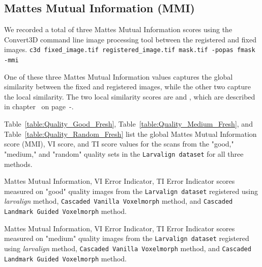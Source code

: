 \documentclass{book}
\begin{document}

	\subsection{Mattes Mutual Information (MMI)}
	We recorded a total of three Mattes Mutual Information \cite{mattes} scores using the Convert3D command line image processing tool between the registered and fixed images. \newline
	\verb|c3d fixed_image.tif registered_image.tif mask.tif -popas fmask -mmi|
	
	One of these three Mattes Mutual Information values captures the global similarity between the fixed and registered images, while the other two capture the local similarity. The two local similarity scores are  and , which are described in chapter~ on page~\pageref{subsubsec:vi}-\pageref{subsubsec:ti}.
	
	Table~\ref{table:Quality_Good_Fresh}, Table~\ref{table:Quality_Medium_Fresh}, and Table~\ref{table:Quality_Random_Fresh} list the global Mattes Mutual Information score (MMI), VI score, and TI score values for the scans from the "good," "medium," and "random" quality sets in the \texttt{Larvalign dataset} for all three methods.

	\begin{table}[h!]
		\centering
		
		\caption{Mattes Mutual Information, VI Error Indicator, TI Error Indicator scores measured on "good" quality images from the \texttt{Larvalign dataset} registered using \emph{larvalign} method, \texttt{Cascaded Vanilla Voxelmorph} method, and \texttt{Cascaded Landmark Guided Voxelmorph} method.}
		\label{table:Quality_Good_Fresh}
	\end{table}

	\begin{table}[h!]
		\centering
		
		\caption{Mattes Mutual Information, VI Error Indicator, TI Error Indicator scores measured on "medium" quality images from the \texttt{Larvalign dataset} registered using \emph{larvalign} method, \texttt{Cascaded Vanilla Voxelmorph} method, and \texttt{Cascaded Landmark Guided Voxelmorph} method.}
		\label{table:Quality_Medium_Fresh}
	\end{table}
\end{document}
